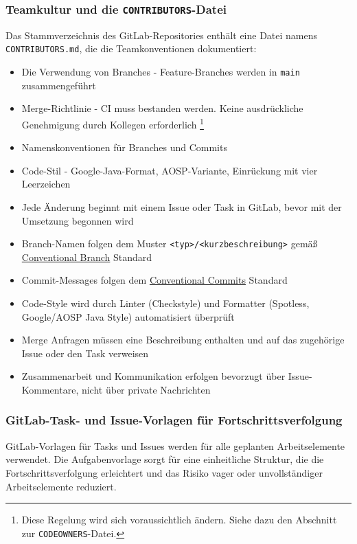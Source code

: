 \documentclass{article}
\begin{document}
\subsubsection{Teamkultur und die \texttt{CONTRIBUTORS}-Datei}
Das Stammverzeichnis des GitLab-Repositories enthält eine Datei namens \texttt{CONTRIBUTORS.md}, die die Teamkonventionen dokumentiert: 
\begin{itemize}
  \item Die Verwendung von Branches - Feature-Branches werden in \texttt{main} zusammengeführt
  \item Merge-Richtlinie - CI muss bestanden werden. Keine ausdrückliche Genehmigung durch Kollegen erforderlich \footnote{Diese Regelung wird sich voraussichtlich ändern. Siehe dazu den Abschnitt zur \texttt{CODEOWNERS}-Datei.}
  \item Namenskonventionen für Branches und Commits
  \item Code-Stil - Google-Java-Format, AOSP-Variante, Einrückung mit vier Leerzeichen
  \item Jede Änderung beginnt mit einem Issue oder Task in GitLab, bevor mit der Umsetzung begonnen wird
  \item Branch-Namen folgen dem Muster \texttt{<typ>/<kurzbeschreibung>} gemäß \href{https://conventional-branch.github.io/}{Conventional Branch} Standard
  \item Commit-Messages folgen dem \href{https://www.conventionalcommits.org/en/v1.0.0/}{Conventional Commits} Standard
  \item Code-Style wird durch Linter (Checkstyle) und Formatter (Spotless, Google/AOSP Java Style) automatisiert überprüft
  \item Merge Anfragen müssen eine Beschreibung enthalten und auf das zugehörige Issue oder den Task verweisen
  \item Zusammenarbeit und Kommunikation erfolgen bevorzugt über Issue-Kommentare, nicht über private Nachrichten
\end{itemize}

\subsubsection{GitLab-Task- und Issue-Vorlagen für Fortschrittsverfolgung}
GitLab-Vorlagen für Tasks und Issues werden für alle geplanten Arbeitselemente verwendet. Die Aufgabenvorlage sorgt für eine einheitliche Struktur, die die Fortschrittsverfolgung erleichtert und das Risiko vager oder unvollständiger Arbeitselemente reduziert.
\end{document}
